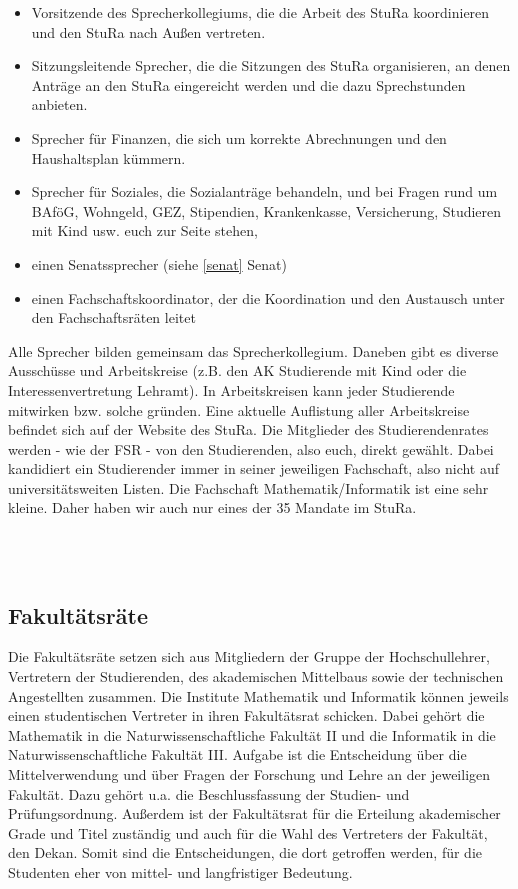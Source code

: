 \begin{itemize}
    \item Vorsitzende des Sprecherkollegiums, die die Arbeit des StuRa koordinieren und den StuRa nach Außen vertreten.
    \item Sitzungsleitende Sprecher, die die Sitzungen des StuRa organisieren, an denen Anträge an den StuRa eingereicht werden und die dazu Sprechstunden anbieten.
    \item Sprecher für Finanzen, die sich um korrekte Abrechnungen und den Haushaltsplan kümmern.
    \item Sprecher für Soziales, die Sozialanträge behandeln, und bei Fragen rund um BAföG, Wohngeld, GEZ, Stipendien, Krankenkasse, Versicherung, Studieren mit Kind usw. euch zur Seite stehen,
    \item einen Senatssprecher (siehe \ref{senat} Senat)
    \item einen Fachschaftskoordinator, der die Koordination und den Austausch unter den Fachschaftsräten leitet
\end{itemize}

Alle Sprecher bilden gemeinsam das Sprecherkollegium.
Daneben gibt es diverse Ausschüsse und Arbeitskreise (z.B. den AK Studierende mit Kind oder die Interessenvertretung Lehramt).
In Arbeitskreisen kann jeder Studierende mitwirken bzw. solche gründen.
Eine aktuelle Auflistung aller Arbeitskreise befindet sich auf der Website des StuRa.
Die Mitglieder des Studierendenrates werden - wie der FSR - von den Studierenden, also euch, direkt gewählt.
Dabei kandidiert ein Studierender immer in seiner jeweiligen Fachschaft, also nicht auf universitätsweiten Listen.
Die Fachschaft Mathematik/Informatik ist eine sehr kleine.
Daher haben wir auch nur eines der 35 Mandate im StuRa.


\\
\\

\subsection{Fakultätsräte}

Die Fakultätsräte setzen sich aus Mitgliedern der Gruppe der Hochschullehrer, Vertretern der Studierenden, des akademischen Mittelbaus sowie der technischen Angestellten zusammen.
Die Institute Mathematik und Informatik können jeweils einen studentischen Vertreter in ihren Fakultätsrat schicken.
Dabei gehört die Mathematik in die Naturwissenschaftliche Fakultät II und die Informatik in die Naturwissenschaftliche Fakultät III.
Aufgabe ist die Entscheidung über die Mittelverwendung und über Fragen der Forschung und Lehre an der jeweiligen Fakultät.
Dazu gehört u.a. die Beschlussfassung der Studien- und Prüfungsordnung.
Außerdem ist der Fakultätsrat für die Erteilung akademischer Grade und Titel zuständig und auch für die Wahl des Vertreters der Fakultät, den Dekan.
Somit sind die Entscheidungen, die dort getroffen werden, für die Studenten eher von mittel- und langfristiger Bedeutung.

